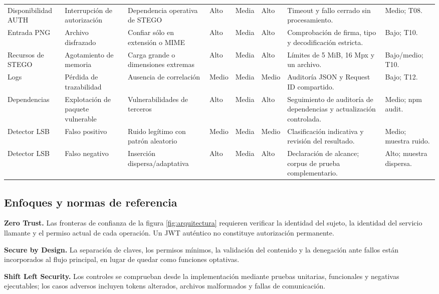 \documentclass[11pt,a4paper,oneside]{article}
\begin{document}
\begin{landscape}
\begin{longtable}{@{}P{2.45cm}P{3.15cm}P{3.7cm}P{1.7cm}P{1.7cm}P{1.8cm}P{5.5cm}P{3.15cm}@{}}
Disponibilidad AUTH & Interrupción de autorización & Dependencia operativa de STEGO & Alto & Media & Alto & Timeout y fallo cerrado sin procesamiento. & Medio; T08.\\
Entrada PNG & Archivo disfrazado & Confiar sólo en extensión o MIME & Alto & Media & Alto & Comprobación de firma, tipo y decodificación estricta. & Bajo; T10.\\
Recursos de STEGO & Agotamiento de memoria & Carga grande o dimensiones extremas & Alto & Media & Alto & Límites de 5 MiB, 16 Mpx y un archivo. & Bajo/medio; T10.\\
Logs & Pérdida de trazabilidad & Ausencia de correlación & Medio & Media & Medio & Auditoría JSON y Request ID compartido. & Bajo; T12.\\
Dependencias & Explotación de paquete vulnerable & Vulnerabilidades de terceros & Alto & Media & Alto & Seguimiento de auditoría de dependencias y actualización controlada. & Medio; npm audit.\\
Detector LSB & Falso positivo & Ruido legítimo con patrón aleatorio & Medio & Media & Medio & Clasificación indicativa y revisión del resultado. & Medio; muestra ruido.\\
Detector LSB & Falso negativo & Inserción dispersa/adaptativa & Alto & Media & Alto & Declaración de alcance; corpus de prueba complementario. & Alto; muestra dispersa.\\
\bottomrule
\end{longtable}
\end{landscape}
\normalsize

\subsection{Enfoques y normas de referencia}
\textbf{Zero Trust.} Las fronteras de confianza de la figura \ref{fig:arquitectura} requieren verificar la identidad del sujeto, la identidad del servicio llamante y el permiso actual de cada operación. Un JWT auténtico no constituye autorización permanente.

\textbf{Secure by Design.} La separación de claves, los permisos mínimos, la validación del contenido y la denegación ante fallos están incorporados al flujo principal, en lugar de quedar como funciones optativas.

\textbf{Shift Left Security.} Los controles se comprueban desde la implementación mediante pruebas unitarias, funcionales y negativas ejecutables; los casos adversos incluyen tokens alterados, archivos malformados y fallas de comunicación.
\end{document}
